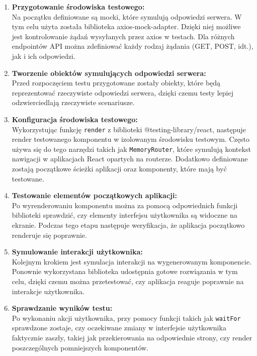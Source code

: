 \documentclass[12pt,a4paper]{article}
\begin{document}
\begin{enumerate}
    \item \textbf{Przygotowanie środowiska testowego:}\\
    Na początku definiowane są mocki, które symulują odpowiedzi serwera. W tym celu użyta została biblioteka axios-mock-adapter. Dzięki niej możliwe jest kontrolowanie żądań wysyłanych przez axios w testach. Dla różnych endpointów API można zdefiniować każdy rodzaj żądania (GET, POST, idt.), jak i ich odpowiedzi.

    \item \textbf{Tworzenie obiektów symulujących odpowiedzi serwera:}\\
    Przed rozpoczęciem testu przygotowane zostały obiekty, które będą reprezentować rzeczywiste odpowiedzi serwera, dzięki czemu testy lepiej odzwierciedlają rzeczywiste scenariusze.

    \item \textbf{Konfiguracja środowiska testowego:}\\
    Wykorzystując funkcję \texttt{render} z biblioteki @testing-library/react, następuje render testowanego komponentu w izolowanym środowisku testowym. Często używa się do tego narzędzi takich jak \texttt{MemoryRouter}, które symulują kontekst nawigacji w aplikacjach React opartych na routerze. Dodatkowo definiowane zostają początkowe ścieżki aplikacji oraz komponenty, które mają być testowane.

    \item \textbf{Testowanie elementów początkowych aplikacji:}\\
    Po wyrenderowaniu komponentu można za pomocą odpowiednich funkcji biblioteki sprawdzić, czy elementy interfejsu użytkownika są widoczne na ekranie. Podczas tego etapu następuje weryfikacja, że aplikacja początkowo renderuje się poprawnie.

    \item \textbf{Symulowanie interakcji użytkownika:}\\
    Kolejnym krokiem jest symulacja interakcji na wygenerowanym komponencie. Ponownie wykorzystana biblioteka udostępnia gotowe rozwiązania w tym celu, dzięki czemu można przetestować, czy aplikacja reaguje poprawnie na interakcje użytkownika.

    \item \textbf{Sprawdzanie wyników testu:}\\
    Po wykonaniu akcji użytkownika, przy pomocy funkcji takich jak \texttt{waitFor} sprawdzone zostaje, czy oczekiwane zmiany w interfejsie użytkownika faktycznie zaszły, takiej jak przekierowania na odpowiednie strony, czy render poszczególnych pomniejszych komponentów.

\end{enumerate}
\end{document}
